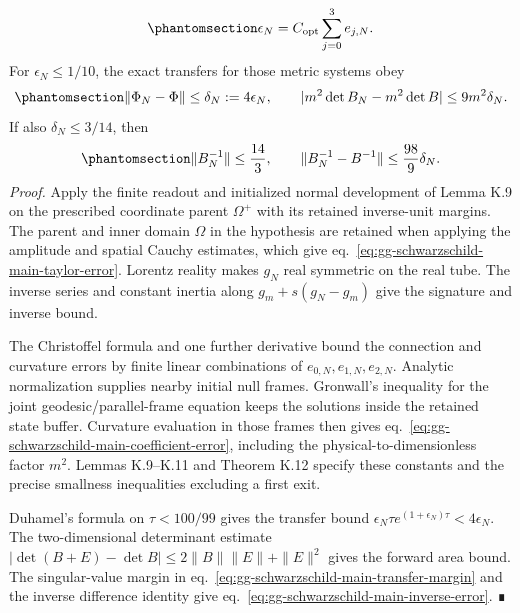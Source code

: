 \documentclass[
  english,
  11pt,
  reqno]{amsart}
\begin{document}
\begin{equation}\protect\phantomsection\label{eq:gg-schwarzschild-main-coefficient-error}{
 \epsilon_N=C_{\rm opt}\sum_{j=0}^3e_{j,N}.
}\end{equation} For \(\epsilon_N\le1/10\), the exact transfers for those
metric systems obey
\begin{equation}\protect\phantomsection\label{eq:gg-schwarzschild-main-optical-error}{
 \|\Phi_N-\Phi\|\le\delta_N:=4\epsilon_N,\qquad
 |m^2\det B_N-m^2\det B|\le9m^2\delta_N.
}\end{equation} If also \(\delta_N\le3/14\), then
\begin{equation}\protect\phantomsection\label{eq:gg-schwarzschild-main-inverse-error}{
 \|B_N^{-1}\|\le\frac{14}{3},\qquad
 \|B_N^{-1}-B^{-1}\|\le\frac{98}{9}\delta_N.
}\end{equation} \emph{Proof.} Apply the finite readout and initialized
normal development of Lemma K.9 on the prescribed coordinate parent
\(\Omega^+\) with its retained inverse-unit margins. The parent and
inner domain \(\Omega\) in the hypothesis are retained when applying the
amplitude and spatial Cauchy estimates, which give
eq.~\ref{eq:gg-schwarzschild-main-taylor-error}. Lorentz reality makes
\(g_N\) real symmetric on the real tube. The inverse series and constant
inertia along \(g_m+s(g_N-g_m)\) give the signature and inverse bound.

The Christoffel formula and one further derivative bound the connection
and curvature errors by finite linear combinations of
\(e_{0,N},e_{1,N},e_{2,N}\). Analytic normalization supplies nearby
initial null frames. Gronwall's inequality for the joint
geodesic/parallel-frame equation keeps the solutions inside the retained
state buffer. Curvature evaluation in those frames then gives
eq.~\ref{eq:gg-schwarzschild-main-coefficient-error}, including the
physical-to-dimensionless factor \(m^2\). Lemmas K.9--K.11 and Theorem
K.12 specify these constants and the precise smallness inequalities
excluding a first exit.

Duhamel's formula on \(\tau<100/99\) gives the transfer bound
\(\epsilon_N\tau e^{(1+\epsilon_N)\tau}<4\epsilon_N\). The
two-dimensional determinant estimate
\(|\det(B+E)-\det B|\le2\|B\|\|E\|+\|E\|^2\) gives the forward area
bound. The singular-value margin in
eq.~\ref{eq:gg-schwarzschild-main-transfer-margin} and the inverse
difference identity give
eq.~\ref{eq:gg-schwarzschild-main-inverse-error}. ∎
\end{document}
